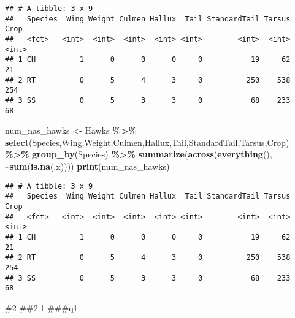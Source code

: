 \documentclass[
]{article}
\newenvironment{Shaded}{\begin{snugshade}}{\end{snugshade}}
\newcommand{\FunctionTok}[1]{\textcolor[rgb]{0.13,0.29,0.53}{\textbf{#1}}}
\newcommand{\NormalTok}[1]{#1}
\newcommand{\OtherTok}[1]{\textcolor[rgb]{0.56,0.35,0.01}{#1}}
\newcommand{\SpecialCharTok}[1]{\textcolor[rgb]{0.81,0.36,0.00}{\textbf{#1}}}
\begin{document}
\begin{verbatim}
## # A tibble: 3 x 9
##   Species  Wing Weight Culmen Hallux  Tail StandardTail Tarsus  Crop
##   <fct>   <int>  <int>  <int>  <int> <int>        <int>  <int> <int>
## 1 CH          1      0      0      0     0           19     62    21
## 2 RT          0      5      4      3     0          250    538   254
## 3 SS          0      5      3      3     0           68    233    68
\end{verbatim}

\begin{Shaded}
\begin{Highlighting}[]
\NormalTok{num\_nas\_hawks }\OtherTok{\textless{}{-}}\NormalTok{ Hawks }\SpecialCharTok{\%\textgreater{}\%} 
  \FunctionTok{select}\NormalTok{(Species,Wing,Weight,Culmen,Hallux,Tail,StandardTail,Tarsus,Crop) }\SpecialCharTok{\%\textgreater{}\%}
  \FunctionTok{group\_by}\NormalTok{(Species) }\SpecialCharTok{\%\textgreater{}\%}
  \FunctionTok{summarize}\NormalTok{(}\FunctionTok{across}\NormalTok{(}\FunctionTok{everything}\NormalTok{(), }\SpecialCharTok{\textasciitilde{}}\FunctionTok{sum}\NormalTok{(}\FunctionTok{is.na}\NormalTok{(.x))))}
\FunctionTok{print}\NormalTok{(num\_nas\_hawks)}
\end{Highlighting}
\end{Shaded}

\begin{verbatim}
## # A tibble: 3 x 9
##   Species  Wing Weight Culmen Hallux  Tail StandardTail Tarsus  Crop
##   <fct>   <int>  <int>  <int>  <int> <int>        <int>  <int> <int>
## 1 CH          1      0      0      0     0           19     62    21
## 2 RT          0      5      4      3     0          250    538   254
## 3 SS          0      5      3      3     0           68    233    68
\end{verbatim}

\#2 \#\#2.1 \#\#\#q1
\end{document}
